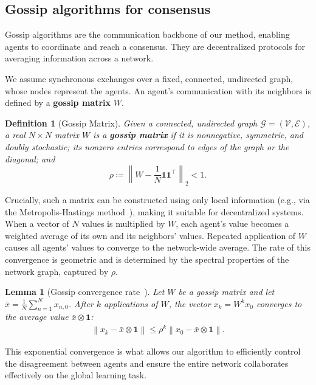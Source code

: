 \documentclass[journal]{IEEEtran}
\newtheorem{definition}{Definition}
\newtheorem{lemma}{Lemma}
\newcommand{\norm}[1]{\left\lVert{#1}\right\rVert}
\begin{document}
\subsection{Gossip algorithms for consensus}\label{subsection:consensus}
Gossip algorithms are the communication backbone of our method, enabling agents to coordinate and reach a consensus.
They are decentralized protocols for averaging information across a network.

    {\color{blue} We assume synchronous exchanges over a fixed, connected, undirected graph, whose nodes represent the agents.}
An agent's communication with its neighbors is defined by a \textbf{gossip matrix} $W$.
    {\color{blue}
        \begin{definition}[Gossip Matrix]\label{def:gossip_matrix}
            Given a connected, undirected graph $\mathcal{G} = (\mathcal{V}, \mathcal{E})$, a real $N\times N$ matrix $W$ is a \textbf{gossip matrix} if it is nonnegative, symmetric, and doubly stochastic; its nonzero entries correspond to edges of the graph or the diagonal; and
            \begin{equation}
                \rho\coloneqq\norm{W-\frac{1}{N}\mathbf{1}\mathbf{1}^\top}_2<1.
            \end{equation}
        \end{definition}
    }

Crucially, such a matrix can be constructed using only local information (e.g., via the Metropolis-Hastings method~\cite{boyd_randomized_2006}), making it suitable for decentralized systems.
When a vector of $N$ values is multiplied by $W$, each agent's value becomes a weighted average of its own and its neighbors' values.
Repeated application of $W$ causes all agents' values to converge to the network-wide average.
The rate of this convergence is geometric and is determined by the spectral properties of the network graph, captured by $\rho$.
\begin{lemma}[Gossip convergence rate~\cite{boyd_randomized_2006}]\label{lemma:gossip}
    Let $W$ be a gossip matrix and let $\bar{x} = \frac{1}{N} \sum_{n=1}^N x_{n,0}$.
    After $k$ applications of $W$, the vector $x_k = W^k x_0$ converges to the average value $\bar{x} \otimes \mathbf{1}$:
    \begin{align}
        \norm{x_{k} - \bar{x} \otimes \mathbf{1}} \leq \rho^k \norm{x_0 - \bar{x} \otimes \mathbf{1}}.
    \end{align}
\end{lemma}
This exponential convergence is what allows our algorithm to efficiently control the disagreement between agents and ensure the entire network collaborates effectively on the global learning task.
\end{document}
